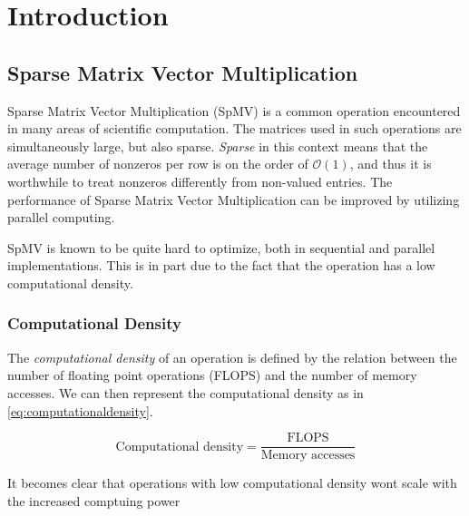 \chapter{Introduction}

\section{Sparse Matrix Vector Multiplication}


Sparse Matrix Vector Multiplication (SpMV) is a common operation encountered in many areas of scientific computation. The matrices used in such operations are simultaneously large, but also sparse. \textit{Sparse} in this context means that the average number of nonzeros per row is on the order of \(\mathcal{O}\left(1\right)\), and thus it is worthwhile to treat nonzeros differently from non-valued entries. The performance of Sparse Matrix Vector Multiplication can be improved by utilizing parallel computing.
\medskip

SpMV is known to be quite hard to optimize, both in sequential and parallel implementations. This is in part due to the fact that the operation has a low computational density.

\subsection{Computational Density}

The \textit{computational density} of an operation is defined by the relation between the number of floating point operations (FLOPS) and the number of memory accesses. We can then represent the computational density as in \ref{eq:computationaldensity}.

\begin{equation}
    \text{Computational density} = \frac{\text{FLOPS}}{\text{Memory accesses}}
    \label{eq:computationaldensity}
\end{equation}

It becomes clear that operations with low computational density wont scale with the increased comptuing power 




